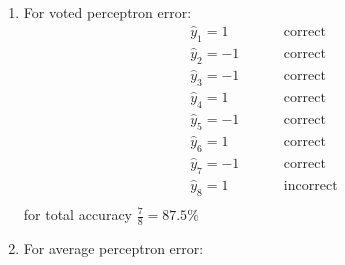 \documentclass[11pt]{article}
\begin{document}
{\begin{enumerate}
\begin{enumerate}
\begin{align*}
                        w_4^{T}x_4 = 10 &\hspace{1cm} \text{correct}\\
                        w_4^{T}x_5 = 1 &\hspace{1cm} \text{incorrect}\\
                        w_4^{T}x_6 = -2 &\hspace{1cm} \text{incorrect}\\
                        w_4^{T}x_7 = -16 &\hspace{1cm} \text{correct}\\
                        w_4^{T}x_8 = -6 &\hspace{1cm} \text{correct}
                    \end{align*}
                    accuracy $\frac{5}{8} = 62.5\%$
                \item For voted perceptron error:
                    \begin{align*}
                        \hat y_1 = 1 &\hspace{1cm} \text{correct}\\                        
                        \hat y_2 = -1 &\hspace{1cm} \text{correct}\\                        
                        \hat y_3 = -1 &\hspace{1cm} \text{correct}\\                        
                        \hat y_4 = 1 &\hspace{1cm} \text{correct}\\                        
                        \hat y_5 = -1 &\hspace{1cm} \text{correct}\\                        
                        \hat y_6 = 1 &\hspace{1cm} \text{correct}\\                        
                        \hat y_7 = -1 &\hspace{1cm} \text{correct}\\                        
                        \hat y_8 = 1 &\hspace{1cm} \text{incorrect}\\                        
                    \end{align*}
                    for total accuracy $\frac{7}{8} = 87.5\%$
                \item For average perceptron error:

\end{enumerate}
\end{enumerate}}
\end{document}
